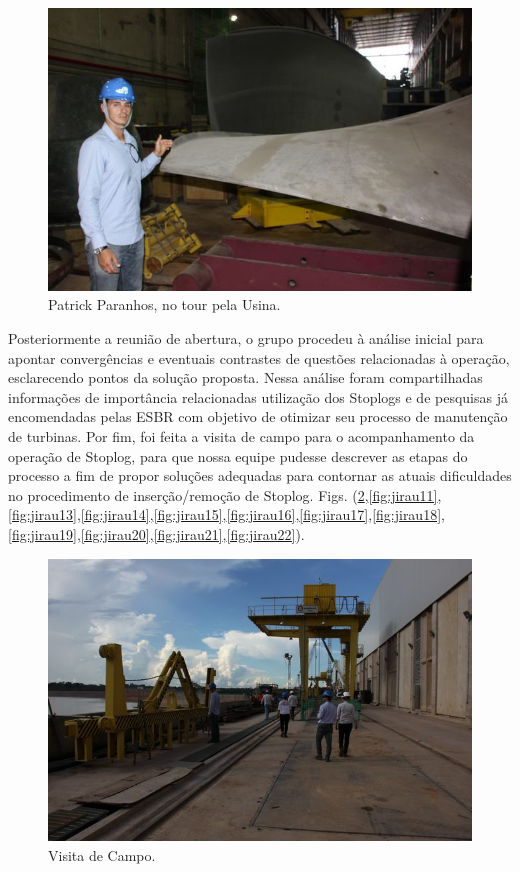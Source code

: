 \begin{figure}[ht!]
    \centering \includegraphics[width=0.6\columnwidth]{figs/jirau/jirau_07}
    \caption{Patrick Paranhos, no tour pela Usina.}
    \label{fig:jirau7}
\end{figure}

\clearpage

Posteriormente a reunião de abertura, o grupo procedeu à análise inicial para
apontar convergências e eventuais contrastes de questões relacionadas à
operação, esclarecendo pontos da solução proposta.  Nessa análise foram
compartilhadas informações de importância relacionadas utilização dos Stoplogs e
de pesquisas já encomendadas pelas ESBR com objetivo de otimizar seu processo de
manutenção de turbinas.
Por fim, foi feita a visita de campo para o acompanhamento da operação de
Stoplog, para que nossa equipe pudesse descrever as etapas do processo a fim de
propor soluções adequadas para contornar as atuais dificuldades no procedimento
de inserção/remoção de Stoplog. Figs.
(\ref{fig:jirau9},\ref{fig:jirau11},\ref{fig:jirau13},\ref{fig:jirau14},\ref{fig:jirau15},\ref{fig:jirau16},\ref{fig:jirau17},\ref{fig:jirau18},\ref{fig:jirau19},\ref{fig:jirau20},\ref{fig:jirau21},\ref{fig:jirau22}).


\begin{figure}[h!]
    \centering \includegraphics[width=0.6\columnwidth]{figs/jirau/jirau_09}
    \caption{Visita de Campo.}
    \label{fig:jirau9}
\end{figure}

